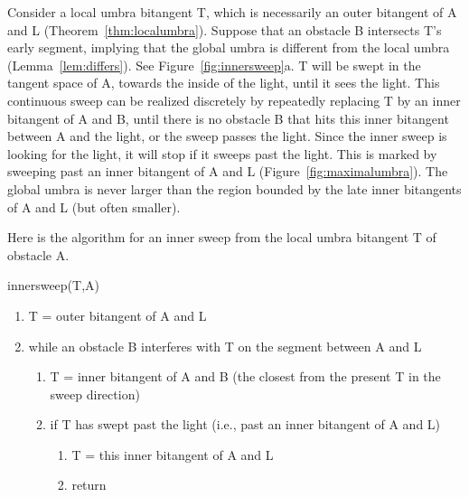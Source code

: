 \documentclass[9pt]{article}
\begin{document}
Consider a local umbra bitangent T, 
which is necessarily an outer bitangent of A and L (Theorem~\ref{thm:localumbra}).
Suppose that an obstacle B intersects T's early segment,
implying that the global umbra is different from the local umbra
(Lemma~\ref{lem:differs}).
See Figure~\ref{fig:innersweep}a.
T will be swept in the tangent space of A, 
towards the inside of the light, until it sees the light.
This continuous sweep can be realized discretely by
repeatedly replacing T by an inner bitangent of A and B,
until there is no obstacle B that hits this inner bitangent
between A and the light, or the sweep passes the light.
Since the inner sweep is looking for the light,
it will stop if it sweeps past the light.
This is marked by sweeping past an inner bitangent of A and L (Figure~\ref{fig:maximalumbra}).
The global umbra is never larger than 
the region bounded by the late inner bitangents of A and L (but often smaller).

Here is the algorithm for an inner sweep from the local umbra bitangent T of obstacle A.


\vspace{.2in}

\centerline{innersweep(T,A)}

\begin{enumerate}
\item T = outer bitangent of A and L
\item while an obstacle B interferes with T on the segment between A and L
\begin{enumerate}
\item T = inner bitangent of A and B (the closest from the present T 
	in the sweep direction)
\item if T has swept past the light (i.e., past an inner bitangent of A and L)
\begin{enumerate}
\item  T = this inner bitangent of A and L
\item  return
\end{enumerate}
\end{enumerate}
\end{enumerate}
\end{document}
